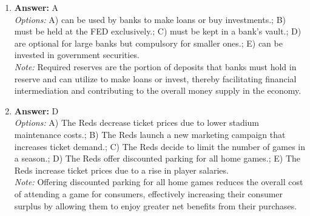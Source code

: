 \documentclass[12pt]{article}
\begin{document}
\begin{enumerate}[label=\arabic*.]
\\ \textit{Note:} The correct answer represents the fitted regression line as an equation where \(\hat{y}_t\) is the predicted value of the dependent variable based on the independent variable \(x_t^2\), with \(\hat{\alpha}\) as the intercept and \(\hat{\beta}\) as the coefficient, encapsulating the relationship established through regression analysis in economics.
\item \textbf{Answer:} A
\\ \textit{Options:} A) can be used by banks to make loans or buy investments.; B) must be held at the FED exclusively.; C) must be kept in a bank's vault.; D) are optional for large banks but compulsory for smaller ones.; E) can be invested in government securities.
\\ \textit{Note:} Required reserves are the portion of deposits that banks must hold in reserve and can utilize to make loans or invest, thereby facilitating financial intermediation and contributing to the overall money supply in the economy.
\item \textbf{Answer:} D
\\ \textit{Options:} A) The Reds decrease ticket prices due to lower stadium maintenance costs.; B) The Reds launch a new marketing campaign that increases ticket demand.; C) The Reds decide to limit the number of games in a season.; D) The Reds offer discounted parking for all home games.; E) The Reds increase ticket prices due to a rise in player salaries.
\\ \textit{Note:} Offering discounted parking for all home games reduces the overall cost of attending a game for consumers, effectively increasing their consumer surplus by allowing them to enjoy greater net benefits from their purchases.
\end{enumerate}
\end{document}
